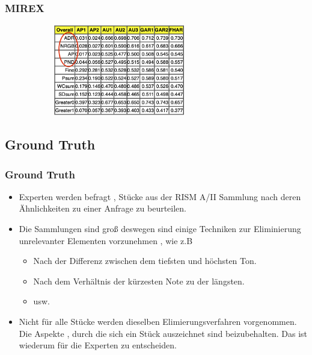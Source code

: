 \documentclass{beamer}
\begin{document}
	\begin{frame}
		\frametitle{MIREX}
		\begin{figure}[h!]
			\includegraphics[width=300px,height=150px,keepaspectratio]{mirex_result_example_change_one}
		\end{figure}
	\end{frame}

	\subsection{Ground Truth}
		
		\begin{frame}
			\frametitle{Ground Truth}
			\begin{itemize}
				\item Experten werden befragt , Stücke aus der RISM A/II Sammlung  nach deren Ähnlichkeiten zu einer Anfrage zu beurteilen.
				\item Die Sammlungen sind groß deswegen sind einige Techniken zur Eliminierung unrelevanter Elementen vorzunehmen , wie z.B
					\begin{itemize}
						\item Nach der Differenz zwischen dem tiefsten und höchsten Ton.
						\item Nach dem Verhältnis der kürzesten Note zu der längsten.
						\item usw.
					\end{itemize}
				\item Nicht für alle Stücke werden dieselben Elimierungsverfahren vorgenommen. Die Aspekte , durch die sich ein Stück auszeichnet sind beizubehalten. Das ist wiederum für die Experten zu entscheiden.
			\end{itemize}
		\end{frame}
\end{document}
